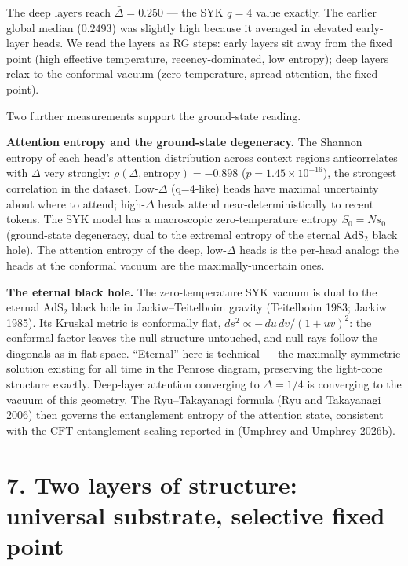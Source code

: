 The deep layers reach \(\bar\Delta = 0.250\) --- the SYK \(q=4\) value
exactly. The earlier global median (\(0.2493\)) was slightly high
because it averaged in elevated early-layer heads. We read the layers as
RG steps: early layers sit away from the fixed point (high effective
temperature, recency-dominated, low entropy); deep layers relax to the
conformal vacuum (zero temperature, spread attention, the fixed point).

Two further measurements support the ground-state reading.

\textbf{Attention entropy and the ground-state degeneracy.} The Shannon
entropy of each head's attention distribution across context regions
anticorrelates with \(\Delta\) very strongly:
\(\rho(\Delta, \text{entropy}) = -0.898\) (\(p = 1.45\times10^{-16}\)),
the strongest correlation in the dataset. Low-\(\Delta\) (q=4-like)
heads have maximal uncertainty about where to attend; high-\(\Delta\)
heads attend near-deterministically to recent tokens. The SYK model has
a macroscopic zero-temperature entropy \(S_0 = N s_0\) (ground-state
degeneracy, dual to the extremal entropy of the eternal
\(\mathrm{AdS}_2\) black hole). The attention entropy of the deep,
low-\(\Delta\) heads is the per-head analog: the heads at the conformal
vacuum are the maximally-uncertain ones.

\textbf{The eternal black hole.} The zero-temperature SYK vacuum is dual
to the eternal \(\mathrm{AdS}_2\) black hole in Jackiw--Teitelboim
gravity (Teitelboim 1983; Jackiw 1985). Its Kruskal metric is
conformally flat, \(ds^2 \propto -\,du\,dv/(1+uv)^2\): the conformal
factor leaves the null structure untouched, and null rays follow the
diagonals as in flat space. ``Eternal'' here is technical --- the
maximally symmetric solution existing for all time in the Penrose
diagram, preserving the light-cone structure exactly. Deep-layer
attention converging to \(\Delta = 1/4\) is converging to the vacuum of
this geometry. The Ryu--Takayanagi formula (Ryu and Takayanagi 2006)
then governs the entanglement entropy of the attention state, consistent
with the \(\mathrm{CFT}\) entanglement scaling reported in (Umphrey and
Umphrey 2026b).

\section{7. Two layers of structure: universal substrate, selective
fixed
point}\label{two-layers-of-structure-universal-substrate-selective-fixed-point}

